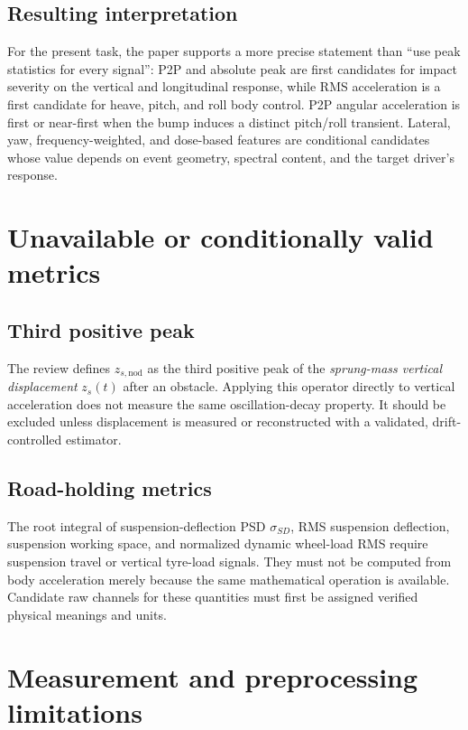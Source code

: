\documentclass[letterpaper,journal]{IEEEtran}
\begin{document}
\subsection{Resulting interpretation}

For the present task, the paper supports a more precise statement than ``use peak statistics
for every signal'': P2P and absolute peak are first candidates for impact severity on the
vertical and longitudinal response, while RMS acceleration is a first candidate for heave,
pitch, and roll body control. P2P angular acceleration is first or near-first when the bump
induces a distinct pitch/roll transient. Lateral, yaw, frequency-weighted, and dose-based
features are conditional candidates whose value depends on event geometry, spectral content,
and the target driver's response.

\section{Unavailable or conditionally valid metrics}

\subsection{Third positive peak}
The review defines $z_{s,\mathrm{nod}}$ as the third positive peak of the \emph{sprung-mass
vertical displacement} $z_s(t)$ after an obstacle. Applying this operator directly to vertical
acceleration does not measure the same oscillation-decay property. It should be excluded unless
displacement is measured or reconstructed with a validated, drift-controlled estimator.

\subsection{Road-holding metrics}
The root integral of suspension-deflection PSD $\sigma_{SD}$, RMS suspension deflection,
suspension working space, and normalized dynamic wheel-load RMS require suspension travel
or vertical tyre-load signals. They must not be computed from body acceleration merely because
the same mathematical operation is available. Candidate raw channels for these quantities must
first be assigned verified physical meanings and units.

\section{Measurement and preprocessing limitations}
\end{document}
